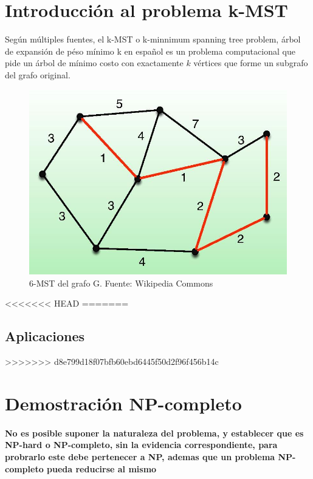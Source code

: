\documentclass[spanish,12pt]{elsarticle}
\begin{document}
\section{Introducción al problema k-MST}
Según múltiples fuentes\cite{3}\cite{5}, el k-MST o k-minnimum spanning tree problem, árbol de expansión de péso mínimo k en español es un problema computacional que pide un árbol de mínimo costo con exactamente $k$ vértices que forme un subgrafo del grafo original.
\begin{figure}[h]
    \centering
    \includegraphics[scale=0.45]{images/6-mst.jpg}
    \caption{6-MST del grafo G. Fuente: Wikipedia Commons}
    \label{fig:my_label}
\end{figure}
<<<<<<< HEAD
=======
\subsection{Aplicaciones}

>>>>>>> d8e799d18f07bfb60ebd6445f50d2f96f456b14c


\section{Demostración NP-completo}
\paragraph{\textnormal{No es posible suponer la naturaleza del problema, y establecer que es NP-hard o NP-completo, sin la evidencia correspondiente, para probrarlo este debe pertenecer a NP, ademas que un problema NP-completo pueda reducirse al mismo}}
\end{document}
